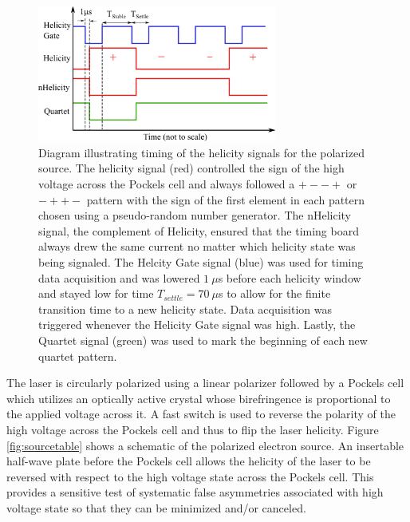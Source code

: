 \begin{figure}[ht]
\begin{center} 
\includegraphics[width=0.7\textwidth]{Pictures/hel_mps_qrt_det_signal_NIM.pdf}
\caption{ \label{fig:helicity_timing} 
Diagram illustrating timing of the helicity signals for the polarized source. The helicity signal (red) controlled the sign of the high voltage across the Pockels cell and always followed a $+ - - +$ or $- + + -$ pattern with the sign of the first element in each pattern chosen using a pseudo-random number generator. The nHelicity signal, the complement of Helicity, ensured that the timing board always drew the same current no matter which helicity state was being signaled. The Helcity Gate signal (blue) was used for timing data acquisition and was lowered $1~\mu$s before each helicity window and stayed low for time $T_{settle}=70~\mu$s to allow for the finite transition time to a new helicity state. Data acquisition was triggered whenever the Helicity Gate signal was high. Lastly, the Quartet signal (green) was used to mark the beginning of each new quartet pattern. }
\end{center}
\end{figure}

The laser is circularly polarized using a linear polarizer followed by a Pockels cell which utilizes an optically active crystal whose birefringence is proportional to the applied voltage across it. A fast switch is used to reverse the polarity of the high voltage across the Pockels cell and thus to flip the laser helicity. Figure \ref{fig:sourcetable} shows a schematic of the polarized electron source. An insertable half-wave plate before the Pockels cell allows the helicity of the laser to be reversed with respect to the high voltage state across the Pockels cell. This provides a sensitive test of systematic false asymmetries associated with high voltage state so that they can be minimized and/or canceled. 


